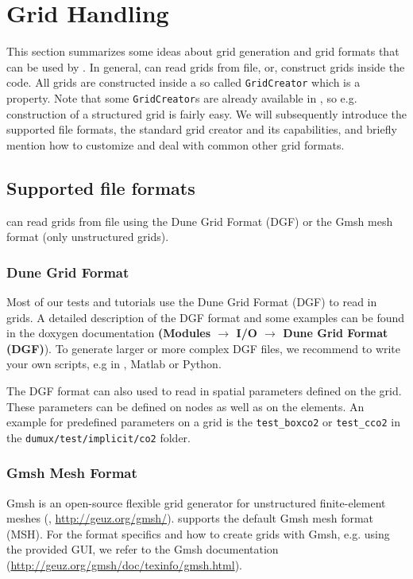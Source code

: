 \section{Grid Handling}
\label{sec:gridhandling}

This section summarizes some ideas about grid generation and grid formats that can be used by \Dumux. In general,
\Dumux can read grids from file, or, construct grids inside the code. All grids are constructed inside a so called \texttt{GridCreator} which is a \Dumux property.
Note that some \texttt{GridCreator}s are already available in \Dumux, so e.g.
construction of a structured grid is fairly easy. We will subsequently introduce the supported file formats, the standard grid creator and its capabilities,
and briefly mention how to customize and deal with common other grid formats.

\subsection{Supported file formats}
\Dumux can read grids from file using the Dune Grid Format (DGF) or the Gmsh mesh format (only unstructured grids).

\subsubsection{Dune Grid Format}
Most of our \Dumux tests and tutorials use the Dune Grid Format (DGF) to read in grids. A detailed description
of the DGF format and some examples can be found in the \Dune doxygen documentation
\textbf{(Modules $\rightarrow$ I/O $\rightarrow$ Dune Grid Format (DGF)}). To generate larger or more
complex DGF files, we recommend to write your own scripts, e.g in \Cplusplus, Matlab or Python.

The DGF format can also used to read in spatial parameters defined on the grid. These parameters can
be defined on nodes as well as on the elements. An example for predefined parameters on a grid is
the \texttt{test\_boxco2} or \texttt{test\_cco2} in the  \texttt{dumux/test/implicit/co2} folder.

\subsubsection{Gmsh Mesh Format}
Gmsh is an open-source flexible grid generator for unstructured finite-element meshes (\cite{GEUZAINE2009}, \url{http://geuz.org/gmsh/}).
\Dumux supports the default Gmsh mesh format (MSH). For the format specifics and how to create grids with Gmsh, e.g. using
the provided GUI, we refer to the Gmsh documentation (\url{http://geuz.org/gmsh/doc/texinfo/gmsh.html}).

